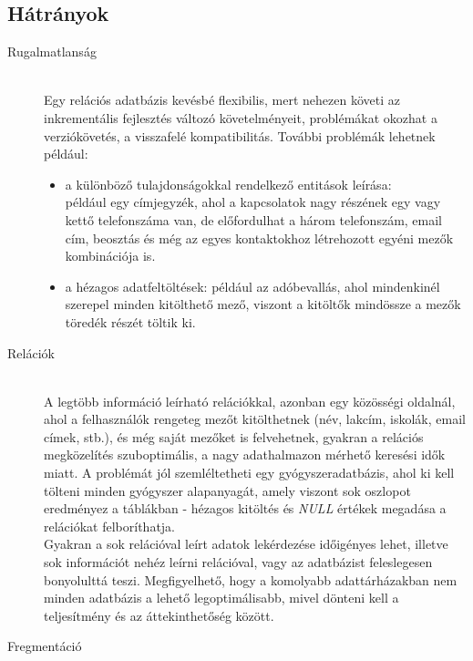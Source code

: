 \subsection{Hátrányok}
	\label{subsect:reldbdisa}
\begin{description}
	\item[Rugalmatlanság] \hfill \\
		Egy relációs adatbázis kevésbé flexibilis, mert nehezen követi az inkrementális fejlesztés változó követelményeit, problémákat okozhat a verziókövetés, a visszafelé kompatibilitás. További problémák lehetnek például:
		\begin{itemize}
			\item a különböző tulajdonságokkal rendelkező entitások leírása: \\
			például egy címjegyzék, ahol a kapcsolatok nagy részének egy vagy kettő telefonszáma van, de előfordulhat a három telefonszám, email cím, beosztás és még az egyes kontaktokhoz létrehozott egyéni mezők kombinációja is.
			\item a hézagos adatfeltöltések: például az adóbevallás, ahol mindenkinél szerepel minden kitölthető mező, viszont a kitöltők mindössze a mezők töredék részét töltik ki.
		\end{itemize}
	\item[Relációk] \hfill \\
		A legtöbb információ leírható relációkkal, azonban egy közösségi oldalnál, ahol a felhasználók rengeteg mezőt kitölthetnek (név, lakcím, iskolák, email címek, stb.), és még saját mezőket is felvehetnek, gyakran a relációs megközelítés szuboptimális, a nagy adathalmazon mérhető keresési idők miatt. A problémát jól szemléltetheti egy gyógyszeradatbázis, ahol ki kell tölteni minden gyógyszer alapanyagát, amely viszont sok oszlopot eredményez a táblákban - hézagos kitöltés és \emph{NULL} értékek megadása a relációkat felboríthatja.\\
		Gyakran a sok relációval leírt adatok lekérdezése időigényes lehet, illetve sok információt nehéz leírni relációval, vagy az adatbázist feleslegesen bonyolulttá teszi. Megfigyelhető, hogy a komolyabb adattárházakban nem minden adatbázis a lehető legoptimálisabb, mivel dönteni kell a teljesítmény és az áttekinthetőség között.
	\item[Fregmentáció] \hfill \\

\end{description}
